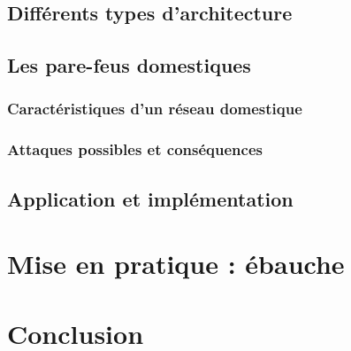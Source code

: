 \documentclass[]{article}
\begin{document}
\subsection{Différents types d'architecture}

\subsection{Les pare-feus domestiques}

\subsubsection{Caractéristiques d'un réseau domestique}

\subsubsection{Attaques possibles et conséquences}

\subsection{Application et implémentation}

\newpage

\section{Mise en pratique : ébauche}
\newpage
\section*{Conclusion}
\end{document}
